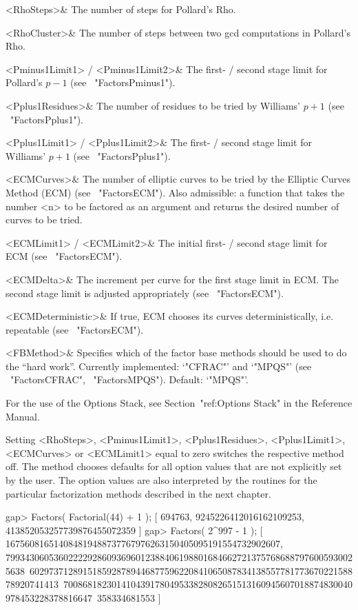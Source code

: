    <RhoSteps>& The number of steps for Pollard's Rho.

   <RhoCluster>& The number of steps between two
   gcd computations in Pollard's Rho.

   <Pminus1Limit1> / <Pminus1Limit2>& The first- / second stage
   limit for Pollard's $p-1$ (see ~"FactorsPminus1").

   <Pplus1Residues>& The number of residues to be tried
   by Williams' $p+1$ (see ~"FactorsPplus1").

   <Pplus1Limit1> / <Pplus1Limit2>& The first- / second stage
   limit for Williams' $p+1$ (see ~"FactorsPplus1").

   <ECMCurves>& The number of elliptic curves to be tried by the
   Elliptic Curves Method (ECM) (see ~"FactorsECM").
   Also admissible: a function that takes the number <n> to be
   factored as an argument and returns the desired number
   of curves to be tried.

   <ECMLimit1> / <ECMLimit2>& The initial first- / second stage
   limit for ECM (see ~"FactorsECM").

   <ECMDelta>& The increment per curve for the first stage limit
   in ECM. The second stage limit is adjusted appropriately
   (see ~"FactorsECM").

   <ECMDeterministic>& If true, ECM chooses its curves 
   deterministically, i.e. repeatable (see ~"FactorsECM").

   <FBMethod>& Specifies which of the factor base methods should be
   used to do the ``hard work''. Currently implemented: `"CFRAC"'
   and `"MPQS"' (see ~"FactorsCFRAC", ~"FactorsMPQS"). Default: `"MPQS"'.
\enditems

For the use of the {\GAP} Options Stack, see Section~"ref:Options Stack"
in the {\GAP} Reference Manual.

Setting <RhoSteps>, <Pminus1Limit1>, <Pplus1Residues>, <Pplus1Limit1>,
<ECMCurves> or <ECMLimit1> equal to zero switches the respective method
off. The method chooses defaults for all option values that are not
explicitly set by the user. The option values are also interpreted by
the routines for the particular factorization methods described in the
next chapter.

\beginexample
gap> Factors( Factorial(44) + 1 );
[ 694763, 9245226412016162109253, 413852053257739876455072359 ]
gap> Factors( 2^997 - 1 );
[ 167560816514084819488737767976263150405095191554732902607,
  7993430605360222292860936960123884061988016846627213757686887976005930025638\
602973712891518592878944687759622084106508783413855778177367022158878920741413\
700868182301410439178049533828082651513160945607018874830040978453228378816647\
358334681553 ]
\endexample

